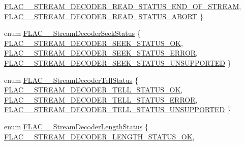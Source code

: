 \begin{DoxyCompactItemize}
\hyperlink{group__flac__stream__decoder_ggad793ead451206c64a91dc0b851027b93a0a0687d25dc9f7163e6e5e294672170f}{F\+L\+A\+C\+\_\+\+\_\+\+S\+T\+R\+E\+A\+M\+\_\+\+D\+E\+C\+O\+D\+E\+R\+\_\+\+R\+E\+A\+D\+\_\+\+S\+T\+A\+T\+U\+S\+\_\+\+E\+N\+D\+\_\+\+O\+F\+\_\+\+S\+T\+R\+E\+AM}, 
\hyperlink{group__flac__stream__decoder_ggad793ead451206c64a91dc0b851027b93a923123aebb349e35662e35a7621b7535}{F\+L\+A\+C\+\_\+\+\_\+\+S\+T\+R\+E\+A\+M\+\_\+\+D\+E\+C\+O\+D\+E\+R\+\_\+\+R\+E\+A\+D\+\_\+\+S\+T\+A\+T\+U\+S\+\_\+\+A\+B\+O\+RT}
 \}
\item 
enum \hyperlink{group__flac__stream__decoder_gac8d269e3c7af1a5889d3bd38409ed67d}{F\+L\+A\+C\+\_\+\+\_\+\+Stream\+Decoder\+Seek\+Status} \{ \hyperlink{group__flac__stream__decoder_ggac8d269e3c7af1a5889d3bd38409ed67daca58132d896ad7755827d3f2b72488cc}{F\+L\+A\+C\+\_\+\+\_\+\+S\+T\+R\+E\+A\+M\+\_\+\+D\+E\+C\+O\+D\+E\+R\+\_\+\+S\+E\+E\+K\+\_\+\+S\+T\+A\+T\+U\+S\+\_\+\+OK}, 
\hyperlink{group__flac__stream__decoder_ggac8d269e3c7af1a5889d3bd38409ed67da969ce92a42a2a95609452e9cf01fcc09}{F\+L\+A\+C\+\_\+\+\_\+\+S\+T\+R\+E\+A\+M\+\_\+\+D\+E\+C\+O\+D\+E\+R\+\_\+\+S\+E\+E\+K\+\_\+\+S\+T\+A\+T\+U\+S\+\_\+\+E\+R\+R\+OR}, 
\hyperlink{group__flac__stream__decoder_ggac8d269e3c7af1a5889d3bd38409ed67da4a01f1e48baf015e78535cc20683ec53}{F\+L\+A\+C\+\_\+\+\_\+\+S\+T\+R\+E\+A\+M\+\_\+\+D\+E\+C\+O\+D\+E\+R\+\_\+\+S\+E\+E\+K\+\_\+\+S\+T\+A\+T\+U\+S\+\_\+\+U\+N\+S\+U\+P\+P\+O\+R\+T\+ED}
 \}
\item 
enum \hyperlink{group__flac__stream__decoder_ga83708207969383bd7b5c1e9148528845}{F\+L\+A\+C\+\_\+\+\_\+\+Stream\+Decoder\+Tell\+Status} \{ \hyperlink{group__flac__stream__decoder_gga83708207969383bd7b5c1e9148528845a516a202ebf4bb61d4a1fb5b029a104dd}{F\+L\+A\+C\+\_\+\+\_\+\+S\+T\+R\+E\+A\+M\+\_\+\+D\+E\+C\+O\+D\+E\+R\+\_\+\+T\+E\+L\+L\+\_\+\+S\+T\+A\+T\+U\+S\+\_\+\+OK}, 
\hyperlink{group__flac__stream__decoder_gga83708207969383bd7b5c1e9148528845aceefd3feb853d5e68a149f2bdd1a9db1}{F\+L\+A\+C\+\_\+\+\_\+\+S\+T\+R\+E\+A\+M\+\_\+\+D\+E\+C\+O\+D\+E\+R\+\_\+\+T\+E\+L\+L\+\_\+\+S\+T\+A\+T\+U\+S\+\_\+\+E\+R\+R\+OR}, 
\hyperlink{group__flac__stream__decoder_gga83708207969383bd7b5c1e9148528845add75538234493c9f7a20a846a223ca91}{F\+L\+A\+C\+\_\+\+\_\+\+S\+T\+R\+E\+A\+M\+\_\+\+D\+E\+C\+O\+D\+E\+R\+\_\+\+T\+E\+L\+L\+\_\+\+S\+T\+A\+T\+U\+S\+\_\+\+U\+N\+S\+U\+P\+P\+O\+R\+T\+ED}
 \}
\item 
enum \hyperlink{group__flac__stream__decoder_gad5860157c2bb34501b8b9370472d727a}{F\+L\+A\+C\+\_\+\+\_\+\+Stream\+Decoder\+Length\+Status} \{ \hyperlink{group__flac__stream__decoder_ggad5860157c2bb34501b8b9370472d727aaef01bfcdc3099686e106d8f88397653d}{F\+L\+A\+C\+\_\+\+\_\+\+S\+T\+R\+E\+A\+M\+\_\+\+D\+E\+C\+O\+D\+E\+R\+\_\+\+L\+E\+N\+G\+T\+H\+\_\+\+S\+T\+A\+T\+U\+S\+\_\+\+OK}, 

\end{DoxyCompactItemize}
